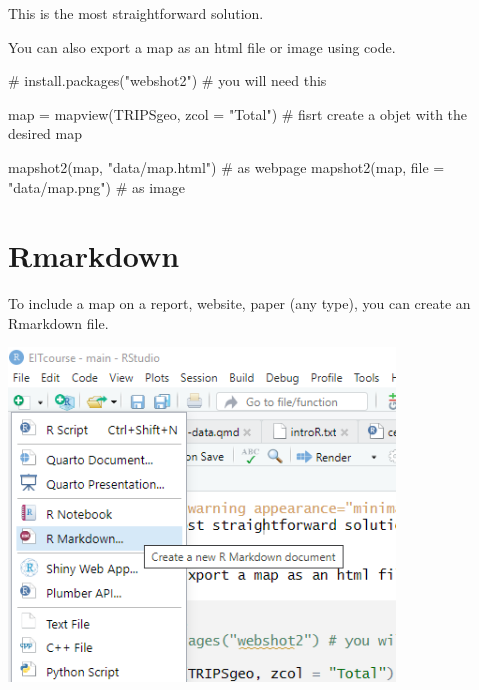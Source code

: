 \documentclass[
  letterpaper,
  DIV=11,
  numbers=noendperiod]{scrreprt}
\newenvironment{Shaded}{\begin{snugshade}}{\end{snugshade}}
\newcommand{\AttributeTok}[1]{\textcolor[rgb]{0.40,0.45,0.13}{#1}}
\newcommand{\CommentTok}[1]{\textcolor[rgb]{0.37,0.37,0.37}{#1}}
\newcommand{\FunctionTok}[1]{\textcolor[rgb]{0.28,0.35,0.67}{#1}}
\newcommand{\NormalTok}[1]{\textcolor[rgb]{0.00,0.23,0.31}{#1}}
\newcommand{\OtherTok}[1]{\textcolor[rgb]{0.00,0.23,0.31}{#1}}
\newcommand{\StringTok}[1]{\textcolor[rgb]{0.13,0.47,0.30}{#1}}
\begin{document}
\begin{tcolorbox}[enhanced jigsaw, breakable, left=2mm, colframe=quarto-callout-warning-color-frame, leftrule=.75mm, bottomrule=.15mm, arc=.35mm, rightrule=.15mm, colback=white, opacityback=0, toprule=.15mm]

This is the most straightforward solution.

\end{tcolorbox}

You can also export a map as an html file or image using code.

\begin{Shaded}
\begin{Highlighting}[]
\CommentTok{\# install.packages("webshot2") \# you will need this}

\NormalTok{map }\OtherTok{=} \FunctionTok{mapview}\NormalTok{(TRIPSgeo, }\AttributeTok{zcol =} \StringTok{"Total"}\NormalTok{) }\CommentTok{\# fisrt create a objet with the desired map}

\FunctionTok{mapshot2}\NormalTok{(map, }\StringTok{"data/map.html"}\NormalTok{) }\CommentTok{\# as webpage}
\FunctionTok{mapshot2}\NormalTok{(map, }\AttributeTok{file =} \StringTok{"data/map.png"}\NormalTok{) }\CommentTok{\# as image}
\end{Highlighting}
\end{Shaded}

\section{Rmarkdown}\label{rmarkdown}

To include a map on a report, website, paper (any type), you can create
an Rmarkdown file.

\includegraphics[width=4.04167in,height=\textheight]{images/clipboard-1842640045.png}
\end{document}
